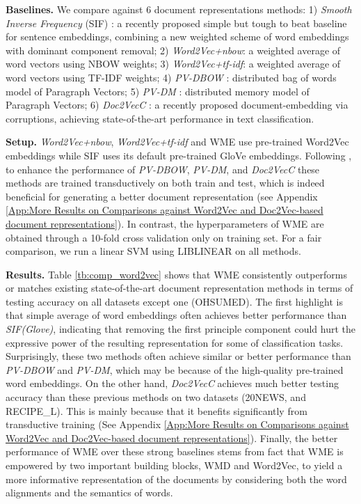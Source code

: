 \documentclass[11pt,a4paper]{article}
\newcommand{\1}{\boldsymbol{1}}
\begin{document}
\noindent
\textbf{Baselines.} We compare against 6 document representations methods: 1) \emph{Smooth Inverse Frequency} (SIF) \cite{arora2017simple}: a recently proposed simple but tough to beat baseline for sentence embeddings, combining a new weighted scheme of word embeddings with dominant component removal; 2) \emph{Word2Vec+nbow}: a weighted average of word vectors using NBOW weights; 3) \emph{Word2Vec+tf-idf}: a weighted average of word vectors using TF-IDF weights; 4) \emph{PV-DBOW} \cite{le2014distributed}: distributed bag of words model of Paragraph Vectors; 5) \emph{PV-DM} \cite{le2014distributed}: distributed memory model of Paragraph Vectors; 6) \emph{Doc2VecC} \cite{Chen2017efficient}: a recently proposed document-embedding via corruptions,  achieving state-of-the-art performance in text classification. 

\vskip0.05in
\noindent
\textbf{Setup.} %
\emph{Word2Vec+nbow}, \emph{Word2Vec+tf-idf} and WME use pre-trained Word2Vec embeddings while SIF uses its default pre-trained GloVe embeddings. Following \cite{Chen2017efficient}, to enhance the performance of \emph{PV-DBOW}, \emph{PV-DM}, and \emph{Doc2VecC} these methods are trained transductively on both train and test, which is indeed beneficial for generating a better document representation (see Appendix \ref{App:More Results on Comparisons against Word2Vec and Doc2Vec-based document representations}). In contrast, the hyperparameters of WME are obtained through a 10-fold cross validation only on training set.
For a fair comparison, we run a linear SVM using LIBLINEAR on all methods.

\vskip0.05in
\noindent
\textbf{Results.} Table \ref{tb:comp_word2vec} shows that WME consistently outperforms or matches existing state-of-the-art document representation methods in terms of testing accuracy on all datasets except one (OHSUMED). The first highlight is that simple average of word embeddings often achieves better performance than \emph{SIF(Glove)}, indicating that removing the first principle component could hurt the expressive power of the resulting representation for some of classification tasks. Surprisingly, these two methods often achieve similar or better performance than \emph{PV-DBOW} and \emph{PV-DM}, which may be because of the high-quality pre-trained word embeddings. On the other hand, \emph{Doc2VecC} achieves much better testing accuracy than these previous methods on two datasets (20NEWS, and RECIPE\_L). This is mainly because that it benefits significantly from transductive training (See Appendix \ref{App:More Results on Comparisons against Word2Vec and Doc2Vec-based document representations}). Finally, the better performance of WME over these strong baselines stems from fact that WME is empowered by two important building blocks, WMD and Word2Vec, to yield a more informative representation of the documents by considering both the word alignments and the semantics of words. 
\end{document}
